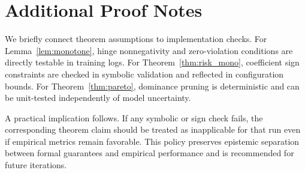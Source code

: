 \documentclass{article} %
\begin{document}
\section{Additional Proof Notes}
\label{sec:appendix_proofs}
We briefly connect theorem assumptions to implementation checks. For Lemma~\ref{lem:monotone}, hinge nonnegativity and zero-violation conditions are directly testable in training logs. For Theorem~\ref{thm:risk_mono}, coefficient sign constraints are checked in symbolic validation and reflected in configuration bounds. For Theorem~\ref{thm:pareto}, dominance pruning is deterministic and can be unit-tested independently of model uncertainty.

A practical implication follows. If any symbolic or sign check fails, the corresponding theorem claim should be treated as inapplicable for that run even if empirical metrics remain favorable. This policy preserves epistemic separation between formal guarantees and empirical performance and is recommended for future iterations.
\end{document}
